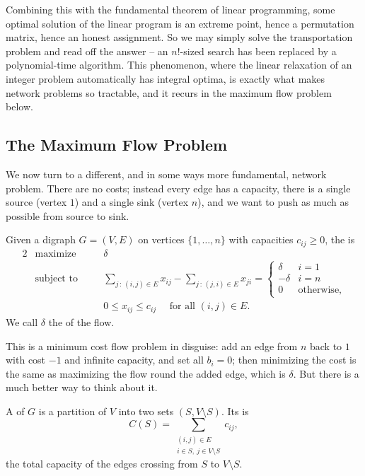 \documentclass[a4paper]{scrartcl}
\begin{document}
Combining this with the fundamental theorem of linear programming, some optimal solution of the linear program is an extreme point, hence a permutation matrix, hence an honest assignment. So we may simply solve the transportation problem and read off the answer -- an $n!$-sized search has been replaced by a polynomial-time algorithm. This phenomenon, where the linear relaxation of an integer problem automatically has integral optima, is exactly what makes network problems so tractable, and it recurs in the maximum flow problem below.

\subsection{The Maximum Flow Problem}

We now turn to a different, and in some ways more fundamental, network problem. There are no costs; instead every edge has a capacity, there is a single source (vertex $1$) and a single sink (vertex $n$), and we want to push as much as possible from source to sink.

\begin{definition}
    Given a digraph $G = (V,E)$ on vertices $\{1, \dots, n\}$ with capacities $c_{ij} \geq 0$, the  is
    \begin{alignat*}{2}
        & \text{maximize} \quad && \delta \\
        & \text{subject to} \quad && \sum_{j\,:\,(i,j)\in E}x_{ij} - \sum_{j\,:\,(j,i)\in E}x_{ji} = \begin{cases}\delta & i = 1\\ -\delta & i = n\\ 0 & \text{otherwise},\end{cases}\\
        & && 0 \leq x_{ij} \leq c_{ij} \quad \text{ for all } (i,j)\in E.
    \end{alignat*}
    We call $\delta$ the  of the flow.
\end{definition}

This is a minimum cost flow problem in disguise: add an edge from $n$ back to $1$ with cost $-1$ and infinite capacity, and set all $b_i = 0$; then minimizing the cost is the same as maximizing the flow round the added edge, which is $\delta$. But there is a much better way to think about it.

\begin{definition}[Cut]
    A  of $G$ is a partition of $V$ into two sets $(S, V\setminus S)$. Its  is
    $$
    C(S) = \sum_{\substack{(i,j) \in E \\ i \in S,\ j \in V\setminus S}} c_{ij},
    $$
    the total capacity of the edges crossing from $S$ to $V\setminus S$.
\end{definition}
\end{document}
